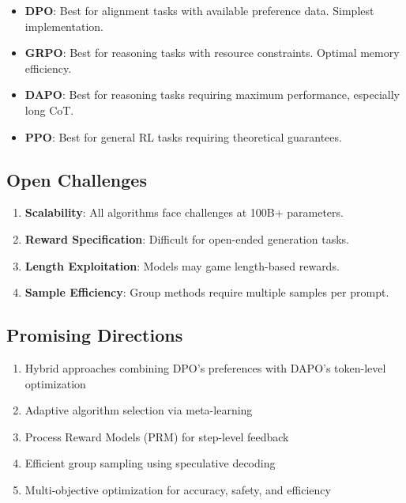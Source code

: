\documentclass[10pt,twocolumn]{article}
\begin{document}
\begin{itemize}[leftmargin=*, itemsep=1pt]
\item \textbf{DPO}: Best for alignment tasks with available preference data. Simplest implementation.
\item \textbf{GRPO}: Best for reasoning tasks with resource constraints. Optimal memory efficiency.
\item \textbf{DAPO}: Best for reasoning tasks requiring maximum performance, especially long CoT.
\item \textbf{PPO}: Best for general RL tasks requiring theoretical guarantees.
\end{itemize}

\subsection{Open Challenges}

\begin{enumerate}[leftmargin=*, itemsep=1pt]
\item \textbf{Scalability}: All algorithms face challenges at 100B+ parameters.
\item \textbf{Reward Specification}: Difficult for open-ended generation tasks.
\item \textbf{Length Exploitation}: Models may game length-based rewards.
\item \textbf{Sample Efficiency}: Group methods require multiple samples per prompt.
\end{enumerate}

\subsection{Promising Directions}

\begin{enumerate}[leftmargin=*, itemsep=1pt]
\item Hybrid approaches combining DPO's preferences with DAPO's token-level optimization
\item Adaptive algorithm selection via meta-learning
\item Process Reward Models (PRM) for step-level feedback
\item Efficient group sampling using speculative decoding
\item Multi-objective optimization for accuracy, safety, and efficiency
\end{enumerate}

\end{document}
